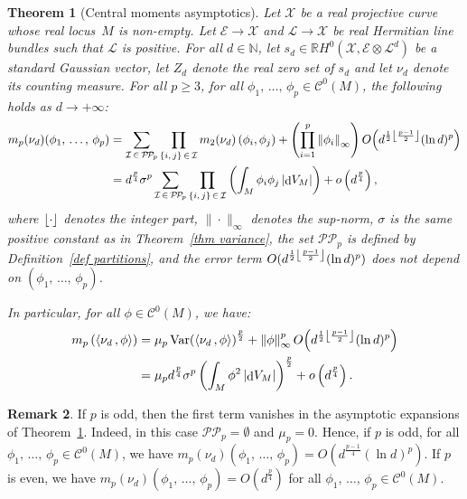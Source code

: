 \documentclass[10pt]{amsart}
\newtheorem{theo}{Theorem}[section]
\theoremstyle{definition}\newtheorem{defi}[theo]{Definition}\newtheorem{rema}[theo]{Remark}\newtheorem{exam}[theo]{Example}\newtheorem{exem}[theo]{Example}\newtheorem{nota}[theo]{Notation}
\DeclareMathOperator{\dmesure}{d}
\DeclareMathOperator{\Var}{Var}
\DeclarePairedDelimiter{\floor}{\lfloor}{\rfloor}
\newcommand{\E}{\mathcal{E}}
\newcommand{\I}{\mathcal{I}}
\newcommand{\X}{\mathcal{X}}
\renewcommand{\L}{\mathcal{L}}
\newcommand{\clC}{\mathcal{C}}
\newcommand{\pp}{\mathcal{P\!P}\!}
\newcommand{\N}{\mathbb{N}}
\newcommand{\R}{\mathbb{R}}
\newcommand{\norm}[1]{\left\lvert #1 \right\rvert}
\newcommand{\Norm}[1]{\left\lVert #1 \right\rVert}
\newcommand{\prsc}[2]{\left\langle #1\,, #2 \right\rangle}
\newcommand{\rmes}[1]{\norm{\dmesure\! V_{#1}}}
\newcommand{\var}[1]{\Var\!\left(#1 \right)}
\renewcommand{\H}{H^0(\X,\E \otimes \L^d)}
\renewcommand{\geq}{\geqslant}
\begin{document}
\begin{theo}[Central moments asymptotics]\label{thm main}
Let $\X$ be a real projective curve whose real locus~$M$ is non-empty. Let $\E \to \X$ and $\L \to \X$ be real Hermitian line bundles such that $\L$ is positive. For all $d \in \N$, let $s_d \in \R\H$ be a standard Gaussian vector, let $Z_d$ denote the real zero set of $s_d$ and let $\nu_d$ denote its counting measure. For all $p \geq 3$, for all $\phi_1,\,\dots,\,\phi_p \in \clC^0(M)$, the following holds as $d \to +\infty$:
\begin{align*}
m_p(\nu_d)(\phi_1,\,\dots,\,\phi_p) &= \sum_{\I\,\in\,\pp_p} \prod_{\{i,\,j\} \,\in\,\I} m_2(\nu_d)\left(\phi_i,\phi_j\right) + \left(\prod_{i=1}^p \Norm{\phi_i}_\infty\right) O\!\left(d^{\frac{1}{2}\floor*{\frac{p-1}{2}}}(\ln d)^p\right)\\
&= d^\frac{p}{4}\sigma^p \sum_{\I\,\in\, \pp_p} \prod_{\{i,\,j\}\,\in\,\I} \left(\int_M \phi_i\phi_j \rmes{M}\right) + o\left(d^\frac{p}{4}\right),
\end{align*}
where $\floor*{\cdot}$ denotes the integer part, $\|\cdot\|_\infty$ denotes the sup-norm, $\sigma$ is the same positive constant as in Theorem~\ref{thm variance}, the set $\pp_p$ is defined by Definition~\ref{def partitions}, and the error term $O(d^{\frac{1}{2}\floor*{\frac{p-1}{2}}}(\ln d)^p)$ does not depend on $(\phi_1,\,\dots,\,\phi_p)$.

In particular, for all $\phi \in \clC^0(M)$, we have:
\begin{align*}
m_p\left(\prsc{\nu_d}{\phi}\right) &= \mu_p \var{\prsc{\nu_d}{\phi}}^\frac{p}{2} + \Norm{\phi}_\infty^p O\!\left(d^{\frac{1}{2}\floor*{\frac{p-1}{2}}}(\ln d)^p\right)\\
&= \mu_p d^\frac{p}{4}\sigma^p \left(\int_M \phi^2 \rmes{M}\right)^\frac{p}{2} + o\left(d^\frac{p}{4}\right).
\end{align*}
\end{theo}

\begin{rema}\label{rem main thm}
If $p$ is odd, then the first term vanishes in the asymptotic expansions of Theorem~\ref{thm main}. Indeed, in this case $\pp_p = \emptyset$ and $\mu_p = 0$. Hence, if $p$ is odd, for all $\phi_1,\,\dots,\,\phi_p \in \clC^0(M)$, we have $m_p(\nu_d)(\phi_1,\,\dots,\,\phi_p) = O(d^{\frac{p-1}{4}}(\ln d)^p)$. If $p$ is even, we have $m_p(\nu_d)(\phi_1,\,\dots,\,\phi_p) = O(d^{\frac{p}{4}})$ for all $\phi_1,\,\dots,\,\phi_p \in \clC^0(M)$.
\end{rema}
\end{document}
